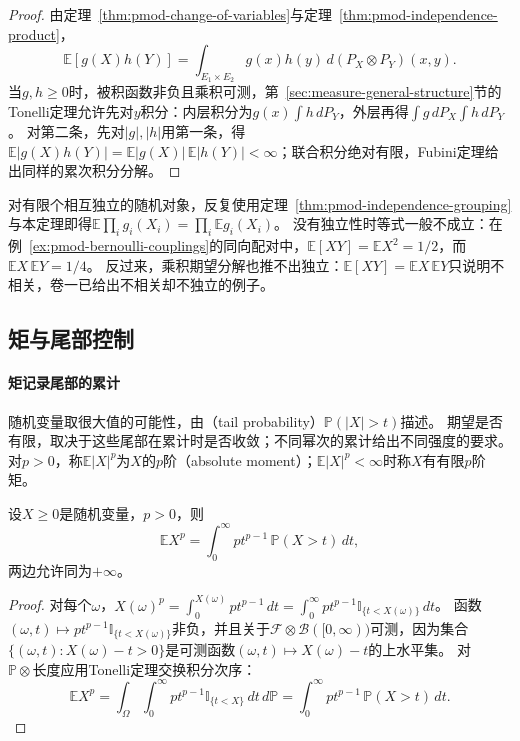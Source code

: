 \begin{proof}
由定理~\ref{thm:pmod-change-of-variables}与定理~\ref{thm:pmod-independence-product}，
\[
  \mathbb E[g(X)h(Y)]=\int_{E_1\times E_2}g(x)h(y)\,d(P_X\otimes P_Y)(x,y).
\]
当$g,h\ge0$时，被积函数非负且乘积可测，第~\ref{sec:measure-general-structure}节的Tonelli定理允许先对$y$积分：内层积分为$g(x)\int h\,dP_Y$，外层再得$\int g\,dP_X\int h\,dP_Y$。
对第二条，先对$|g|,|h|$用第一条，得$\mathbb E|g(X)h(Y)|=\mathbb E|g(X)|\,\mathbb E|h(Y)|<\infty$；联合积分绝对有限，Fubini定理给出同样的累次积分分解。
\end{proof}

对有限个相互独立的随机对象，反复使用定理~\ref{thm:pmod-independence-grouping}与本定理即得$\mathbb E\prod_ig_i(X_i)=\prod_i\mathbb Eg_i(X_i)$。
没有独立性时等式一般不成立：在例~\ref{ex:pmod-bernoulli-couplings}的同向配对中，$\mathbb E[XY]=\mathbb EX^2=1/2$，而$\mathbb EX\,\mathbb EY=1/4$。
反过来，乘积期望分解也推不出独立：$\mathbb E[XY]=\mathbb EX\,\mathbb EY$只说明不相关，卷一已给出不相关却不独立的例子。

\subsection{矩与尾部控制}

\paragraph{矩记录尾部的累计}
随机变量取很大值的可能性，由（tail probability）$\mathbb P(|X|>t)$描述。
期望是否有限，取决于这些尾部在累计时是否收敛；不同幂次的累计给出不同强度的要求。
对$p>0$，称$\mathbb E|X|^p$为$X$的$p$阶（absolute moment）；$\mathbb E|X|^p<\infty$时称$X$有有限$p$阶矩。

\begin{lemma}[尾积分公式]
\label{lem:pmod-tail-formula}
设$X\ge0$是随机变量，$p>0$，则
\[
  \mathbb EX^p=\int_0^\infty pt^{p-1}\,\mathbb P(X>t)\,dt,
\]
两边允许同为$+\infty$。
\end{lemma}

\begin{proof}
对每个$\omega$，$X(\omega)^p=\int_0^{X(\omega)}pt^{p-1}\,dt=\int_0^\infty pt^{p-1}\mathbb I_{\{t<X(\omega)\}}\,dt$。
函数$(\omega,t)\mapsto pt^{p-1}\mathbb I_{\{t<X(\omega)\}}$非负，并且关于$\mathcal F\otimes\mathcal B([0,\infty))$可测，因为集合$\{(\omega,t):X(\omega)-t>0\}$是可测函数$(\omega,t)\mapsto X(\omega)-t$的上水平集。
对$\mathbb P\otimes\text{长度}$应用Tonelli定理交换积分次序：
\[
  \mathbb EX^p=\int_\Omega\int_0^\infty pt^{p-1}\mathbb I_{\{t<X\}}\,dt\,d\mathbb P
  =\int_0^\infty pt^{p-1}\,\mathbb P(X>t)\,dt.
\]
\end{proof}

